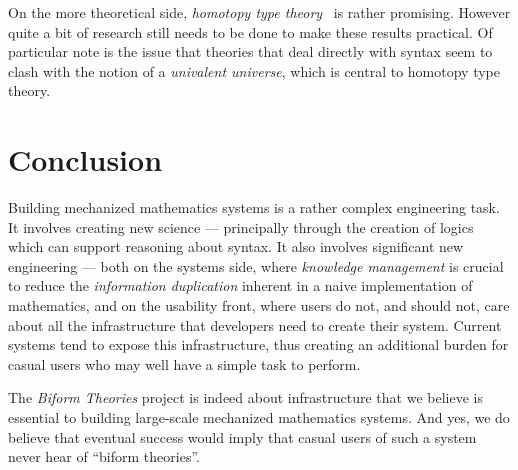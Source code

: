 \documentclass[fleqn]{llncs}
\begin{document}
On the more theoretical side, \emph{homotopy type theory}~\cite{hottbook}
is rather promising.  However quite a bit of research still needs to be
done to make these results practical. Of particular note is the issue
that theories that deal directly with syntax seem to clash with the
notion of a \emph{univalent universe}, which is central to homotopy
type theory.

\section{Conclusion}

Building mechanized mathematics systems is a rather complex engineering
task. It involves creating new science --- principally through the creation
of logics which can support reasoning about syntax.  It also involves significant
new engineering --- both on the systems side, where \emph{knowledge management}
is crucial to reduce the \emph{information duplication} inherent in a
naive implementation of mathematics, and on the usability front, where
users do not, and should not, care about all the infrastructure that 
developers need to create their system. Current systems tend to expose
this infrastructure, thus creating an additional burden for casual users
who may well have a simple task to perform.

The \emph{Biform Theories} project is indeed about infrastructure that
we believe is essential to building large-scale mechanized mathematics
systems. And yes, we do believe that eventual success would imply that
casual users of such a system never hear of ``biform theories''.

%




\end{document}
